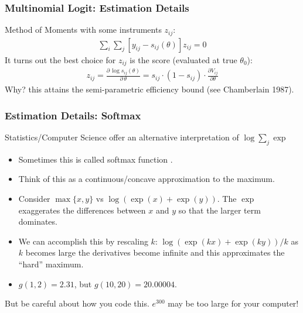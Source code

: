 \begin{frame}
\frametitle{Multinomial Logit: Estimation Details}
Method of Moments with some \alert{instruments} $z_{ij}$:
\begin{align*}
 \sum_{i} \sum_j \left[y_{ij} -  s_{ij}(\theta) \right] z_{ij}=0
\end{align*}
It turns out the best choice for $z_{ij}$ is the \alert{score} (evaluated at true $\theta_0$):
\begin{align*}
z_{ij} = \frac{\partial \, \log   s_{ij}(\theta)}{\partial\, \theta} = s_{ij} \cdot (1-s_{ij}) \cdot \frac{\partial V_{ij}}{\partial \theta}
\end{align*}
Why? this attains the semi-parametric efficiency bound (see Chamberlain 1987).
\end{frame}




\begin{frame}
\frametitle{Estimation Details: Softmax}
Statistics/Computer Science offer an alternative interpretation of $\log \sum_j \exp$
\begin{itemize}
\item Sometimes this is called \alert{softmax} function .
\item Think of this as a continuous/concave approximation to the maximum.
\item Consider $\max\{x,y\}$ vs $\log(\exp(x) + \exp(y))$. The $\exp$ exaggerates the differences between $x$ and $y$ so that the larger term dominates.
\item We can accomplish this by rescaling $k$:  $\log(\exp(kx) + \exp(ky))/k$ as $k$ becomes large the derivatives become infinite and this approximates the ``hard'' maximum.
\item $g(1, 2) = 2.31$, but $g(10, 20) = 20.00004$.
\end{itemize}
But be \alert{careful} about how you code this. $e^{300}$ may be too large for your computer!
\end{frame}

